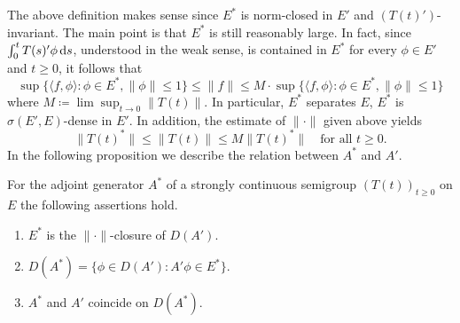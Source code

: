 The above definition makes sense since $E^{*}$ is norm-closed in $E'$ and $(T(t)')$-invariant.
The main point is that $E^{*}$ is still reasonably large.
In fact, since $\int_{0}^{t} T(s)'\phi  \mathop{}\!\mathrm{d}{s}$, understood in the weak sense, is contained in $E^{*}$ for every $\phi \in E'$ and $t \geq 0$, it follows that
\[
    \sup\{\langle f,\phi \rangle \colon \phi \in E^{*}, \|\phi\| \leq 1\} \leq \|f\| \leq M\cdot\sup\{\langle f,\phi \rangle \colon \phi \in E^{*}, \|\phi\| \leq1\}
\]
where $M \coloneqq \lim\sup_{t \to 0} \|T(t)\|$.
In particular, $E^{*}$ separates $E$, \ie $E^{*}$ is $\sigma(E',E)$-dense in $E'$.
In addition, the estimate of $\|\cdot\|$ given above yields
\[
    \|T(t)^{*}\| \leq \|T(t)\| \leq M\|T(t)^{*}\| \quad \text{for all } t \geq 0.
\]
In the following proposition we describe the relation between $A^{*}$ and $A'$.
\begin{proposition*}\label{prop:a1-3.4}
For the adjoint generator $A^{*}$ of a strongly continuous semigroup $(T(t))_{t \geq 0}$ on $E$ the following assertions hold.
\begin{enumerate}[\upshape(i)]
\item 
$E^{*}$ is the $\|\cdot\|$-closure of $D(A')$.

\item 
$D(A^{*}) = \{\phi \in D(A') \colon A'\phi \in E^{*}\}$.

\item 
$A^{*}$ and $A'$ coincide on $D(A^{*})$.
\end{enumerate}
\end{proposition*}

